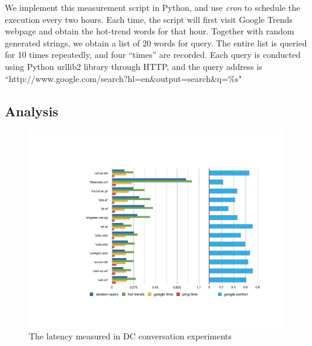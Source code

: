 We implement this measurement script in Python, and use {\it cron} to schedule the execution every two hours. Each time, the script will first visit Google Trends webpage and obtain the hot-trend words for that hour. Together with random generated strings, we obtain a list of 20 words for query. The entire list is queried for 10 times repeatedly, and four ``times'' are recorded. Each query is conducted using Python urllib2 library through HTTP, and the query address is ``http://www.google.com/search?hl=en\&output=search\&q=\%s"


\subsection{Analysis}
\label{sec:analysis}

\begin{figure}
  \centering
  \includegraphics[width=\linewidth]{../figs/data_center.pdf}
  \caption{The latency measured in DC conversation experiments}
  \label{fig:data_center}
\end{figure}


